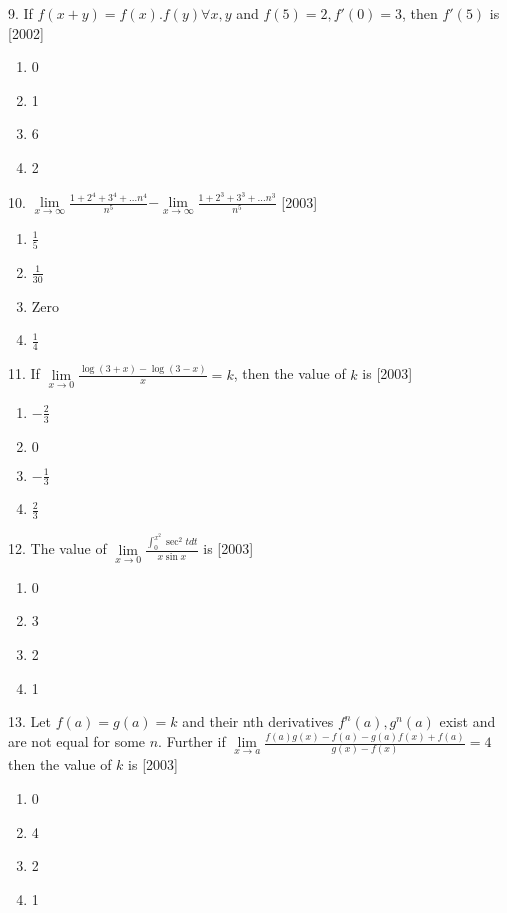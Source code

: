 \documentclass[journal,12pt,twocolumn]{IEEEtran}
\theoremstyle{remark}
\begin{document}
9. If $f(x+y)=f(x).f(y)\forall x,y$ and $f(5)=2,f'(0)=3$, then $f'(5)$ is \hfill [2002]

\begin{enumerate}
    \item 0
    \item 1
    \item 6
    \item 2\\[2pt]
\end{enumerate}

10. $\displaystyle\lim\limits_{x\to\infty}\frac{1+2^4+3^4+\dots n^4}{n^5}$$-$$\displaystyle\lim\limits_{x\to\infty}\frac{1+2^3+3^3+\dots n^3}{n^5}$ \hfill{[2003]}
\begin{enumerate}
    \item $\frac{1}{5}$
    \item $\frac{1}{30}$
    \item Zero
    \item $\frac{1}{4}$\\[2pt]
\end{enumerate}

11. If $\displaystyle \lim\limits_{x\to 0}\frac{\log(3+x)-\log(3-x)}{x} = k$, then the value of $k$ is \hfill{[2003]}
\begin{enumerate}
    \item $-\frac{2}{3}$
    \item $0$
    \item $-\frac{1}{3}$
    \item $\frac{2}{3}$\\[2pt]
\end{enumerate}

12. The value of $\displaystyle \lim\limits_{x\to 0}\frac{\int_{0}^{x^2} \sec^2tdt}{x\sin x}$ is \hfill [2003]
\begin{enumerate}
    \item 0 
    \item 3
    \item 2
    \item 1\\[2pt]
\end{enumerate}

13. Let $f(a)=g(a)=k$ and their nth derivatives $f^n(a),g^n(a)$ exist and are not equal for some $n$. Further if $\displaystyle \lim\limits_{x\to a}\frac{f(a)g(x)-f(a)-g(a)f(x)+f(a)}{g(x)-f(x)}=4$ then the value of $k$ is \hfill [2003]

\begin{enumerate}
    \item 0
    \item 4
    \item 2
    \item 1\\[2pt]
\end{enumerate}
\end{document}
